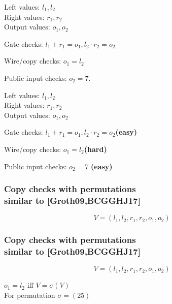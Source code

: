 \documentclass[shadesubsections,trans,14pt,mathserif]{beamer}
\begin{document}
\begin{frame}
Left values: 
$l_1,l_2$\\
Right values: $r_1,r_2$\\
Output values:
$o_1,o_2$


 \vspace{0.2in}

Gate checks:
 $l_1 + r_1 = o_1 , l_2\cdot r_2 = o_2$


Wire/copy checks:
$o_1 = l_2$

Public input checks: $o_2=7$.
\end{frame}
\begin{frame}


Left values: 
$l_1,l_2$\\
Right values: $r_1,r_2$\\
Output values:
$o_1,o_2$


 \vspace{0.2in}

Gate checks:
 $l_1 + r_1 = o_1 , l_2\cdot r_2 = o_2$\;\;\textbf{\small{(easy)}}


Wire/copy checks:
$o_1 = l_2$\;\;\textbf{\small{(hard)}}

Public input checks: $o_2=7$ \textbf{\small{(easy)}}
\end{frame}


\begin{frame}
\frametitle{Copy checks with permutations\\ \normalsize{similar to [Groth09,BCGGHJ17]}}   %
 
 
 \[V= (l_1,l_2,r_1,r_2,o_1,o_2)\]
 
 

\end{frame}


\begin{frame}
\frametitle{Copy checks with permutations\\ \normalsize{similar to [Groth09,BCGGHJ17]}}   %
 
 
 \[V= (l_1,l_2,r_1,r_2,o_1,o_2)\]
 
 $o_1=l_2$ iff $V=\sigma(V)$ \\
 For permutation $\sigma = (25)$
 
 

\end{frame}
\end{document}
